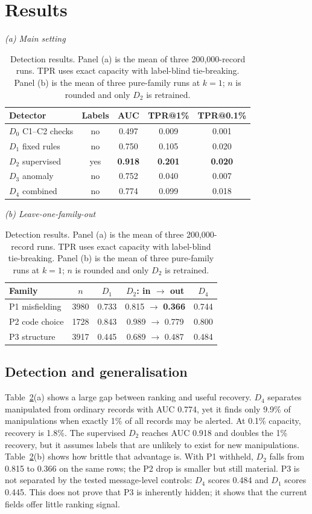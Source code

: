 \documentclass[conference]{IEEEtran}
\begin{document}
\section{Results}
\begin{table}[!t]
\caption{Detection results. Panel (a) is the mean of three 200,000-record runs.
TPR uses exact capacity with label-blind tie-breaking. Panel (b) is the mean of
three pure-family runs at $k=1$; $n$ is rounded and only $D_2$ is retrained.}
\label{tab:results}
\centering
\scriptsize
\textit{(a) Main setting}\\[-2pt]
\begin{tabular}{@{}lcccc@{}}
\toprule
Detector & Labels & AUC & TPR@1\% & TPR@0.1\% \\
\midrule
$D_0$ C1--C2 checks & no & 0.497 & 0.009 & 0.001 \\
$D_1$ fixed rules & no & 0.750 & 0.105 & 0.020 \\
$D_2$ supervised & yes & \textbf{0.918} & \textbf{0.201} & \textbf{0.020} \\
$D_3$ anomaly & no & 0.752 & 0.040 & 0.007 \\
$D_4$ combined & no & 0.774 & 0.099 & 0.018 \\
\bottomrule
\end{tabular}
 
\vspace{3pt}
\textit{(b) Leave-one-family-out}\\[-2pt]
\begin{tabular}{@{}lcccc@{}}
\toprule
Family & $n$ & $D_1$ & $D_2$: in $\rightarrow$ out & $D_4$ \\
\midrule
P1 misfielding & 3980 & 0.733 & 0.815 $\rightarrow$ \textbf{0.366} & 0.744 \\
P2 code choice & 1728 & 0.843 & 0.989 $\rightarrow$ 0.779 & 0.800 \\
P3 structure & 3917 & 0.445 & 0.689 $\rightarrow$ 0.487 & 0.484 \\
\bottomrule
\end{tabular}
\end{table}
\subsection{Detection and generalisation}
Table~\ref{tab:results}(a) shows a large gap between ranking and useful
recovery. $D_4$ separates manipulated from ordinary records with AUC 0.774,
yet it finds only 9.9\% of manipulations when exactly 1\% of all records may be
alerted. At 0.1\% capacity, recovery is 1.8\%. The supervised $D_2$ reaches
AUC 0.918 and doubles the 1\% recovery, but it assumes labels that are unlikely
to exist for new manipulations.
Table~\ref{tab:results}(b) shows how brittle that advantage is. With P1
withheld, $D_2$ falls from 0.815 to 0.366 on the same rows; the P2 drop is
smaller but still material. P3 is not separated by the tested message-level
controls: $D_4$ scores 0.484 and $D_1$ scores 0.445. This does not prove that
P3 is inherently hidden; it shows that the current fields offer little ranking
signal.
\end{document}
